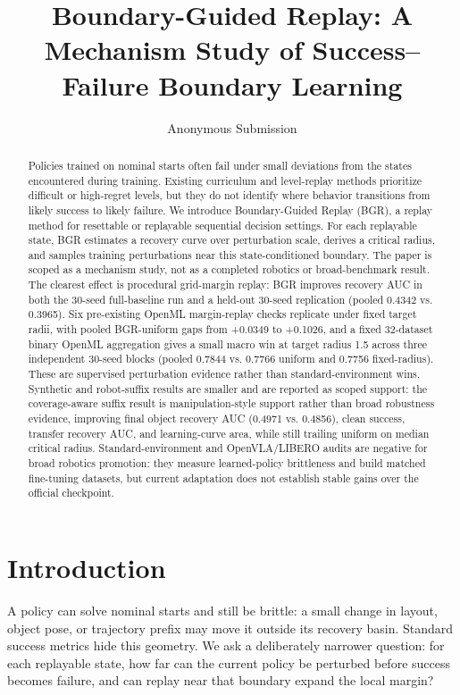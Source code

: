 \documentclass[letterpaper]{article}
\title{Boundary-Guided Replay: A Mechanism Study of Success--Failure Boundary Learning}
\author{Anonymous Submission}
\begin{document}
\maketitle

\begin{abstract}
Policies trained on nominal starts often fail under small deviations from the
states encountered during training. Existing curriculum and level-replay
methods prioritize difficult or high-regret levels, but they do not identify
where behavior transitions from likely success to likely failure. We introduce
Boundary-Guided Replay (BGR), a replay method for resettable or replayable
sequential decision settings. For each replayable state, BGR estimates a
recovery curve over perturbation scale, derives a critical radius, and samples
training perturbations near this state-conditioned boundary. The paper is
scoped as a mechanism study, not as a completed robotics or broad-benchmark
result. The clearest effect is procedural grid-margin replay: BGR improves
recovery AUC in both the 30-seed full-baseline run and a held-out 30-seed
replication (pooled 0.4342 vs. 0.3965). Six pre-existing OpenML
margin-replay checks replicate under fixed target radii, with pooled
BGR-uniform gaps from +0.0349 to +0.1026, and a fixed 32-dataset binary
OpenML aggregation gives a small macro win at target radius 1.5 across three
independent 30-seed blocks (pooled 0.7844 vs. 0.7766 uniform and 0.7756
fixed-radius). These are supervised perturbation
evidence rather than standard-environment wins. Synthetic and
robot-suffix results are smaller and are reported as scoped support: the coverage-aware suffix result is manipulation-style support rather than broad robustness evidence, improving final object recovery AUC (0.4971 vs. 0.4856),
clean success, transfer recovery AUC, and learning-curve area, while still
trailing uniform on median critical radius. Standard-environment and
OpenVLA/LIBERO audits are negative for broad robotics promotion: they measure
learned-policy brittleness and build matched fine-tuning datasets, but current
adaptation does not establish stable gains over the official checkpoint.
\end{abstract}

\section{Introduction}

A policy can solve nominal starts and still be brittle: a small change in layout, object pose, or trajectory prefix may move it outside its recovery basin. Standard success metrics hide this geometry. We ask a deliberately narrower question: for each replayable state, how far can the current policy be perturbed before success becomes failure, and can replay near that boundary expand the local margin?
\end{document}
